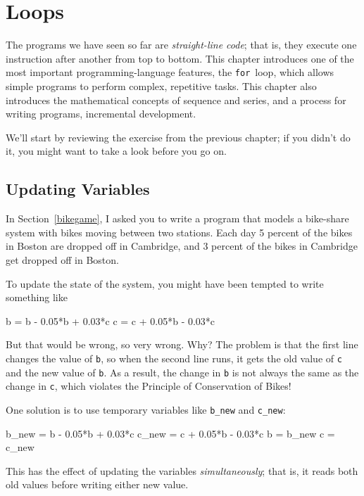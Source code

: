 
\chapter{Loops}
\label{loops}


The programs we have seen so far are \emph{straight-line code}; that is, they execute one instruction after another from top to bottom.
This chapter introduces one of the most important programming-language features, the \lstinline{for}~loop, which allows simple programs to perform complex, repetitive tasks. This chapter also introduces the mathematical concepts of sequence and series, and a process for writing programs, incremental development.

We'll start by reviewing the exercise from the previous chapter; if you didn't do it, you might want to take a look before you go on.

\section{Updating Variables}

In Section~\ref{bikegame}, I asked you to write a program that models a bike-share system with bikes moving between two stations.
Each day 5 percent of the bikes in Boston are dropped off in Cambridge, and 3 percent of the bikes
in Cambridge get dropped off in Boston.

To update the state of the system, you might have been tempted to write something
like


\begin{code}
b = b - 0.05*b + 0.03*c
c = c + 0.05*b - 0.03*c
\end{code}

But that would be wrong, so very wrong.  Why?  The problem is that
the first line changes the value of \lstinline{b}, so when the second line
runs, it gets the old value of \lstinline{c} and the new value of \lstinline{b}.
As a result, the change in \lstinline{b} is not always the same as the
change in \lstinline{c}, which violates the Principle of Conservation
of Bikes!

One solution is to use temporary variables like \lstinline{b_new} and \lstinline{c_new}:

\begin{code}
b_new = b - 0.05*b + 0.03*c
c_new = c + 0.05*b - 0.03*c
b = b_new
c = c_new
\end{code}

This has the effect of updating the variables \emph{simultaneously}; that
is, it reads both old values before writing either new value.

